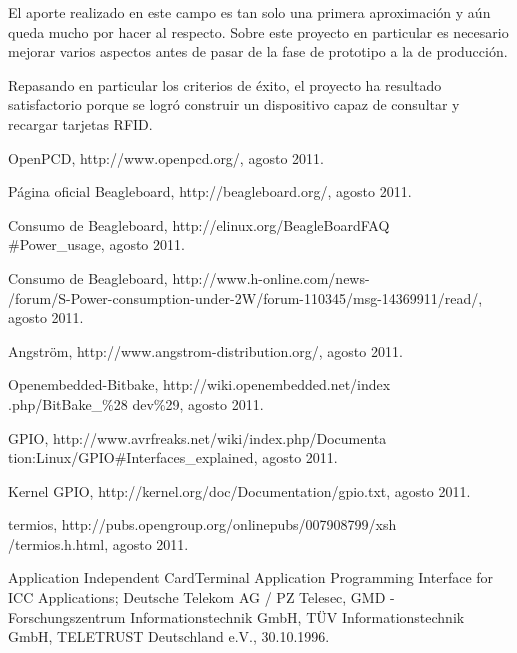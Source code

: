 \documentclass[%
        final,
        notitlepage,
        narroweqnarray,
        inline,
        ]{ieee}
\begin{document}
El aporte realizado en este campo es tan solo una primera aproximación y aún 
queda mucho por hacer al respecto. Sobre este proyecto en particular es
necesario mejorar varios aspectos antes de pasar de la fase de prototipo
a la de producción.


Repasando en particular los criterios de éxito, el proyecto ha resultado satisfactorio
porque se logró construir un dispositivo capaz de consultar y recargar tarjetas RFID.




%
%
\begin{thebibliography}{15}

 OpenPCD, http://www.openpcd.org/, agosto 2011.

 Página oficial Beagleboard, http://beagleboard.org/, agosto 2011.

 Consumo de Beagleboard, http://elinux.org/BeagleBoardFAQ\\
\#Power\_usage, agosto 2011.

 Consumo de Beagleboard, http://www.h-online.com/news-\\
/forum/S-Power-consumption-under-2W/forum-110345/msg-14369911/read/, agosto 2011.

 Angström, http://www.angstrom-distribution.org/, agosto 2011.

 Openembedded-Bitbake, http://wiki.openembedded.net/index\\
.php/BitBake\_\%28
dev\%29, agosto 2011.

 GPIO, http://www.avrfreaks.net/wiki/index.php/Documenta\\
tion:Linux/GPIO\#Interfaces\_explained, agosto 2011.

 Kernel GPIO, http://kernel.org/doc/Documentation/gpio.txt, agosto 2011.

 termios, http://pubs.opengroup.org/onlinepubs/007908799/xsh\\
/termios.h.html, agosto 2011.

 Application Independent CardTerminal Application Programming Interface for ICC Applications; 
Deutsche Telekom AG / PZ Telesec, GMD - Forschungszentrum Informationstechnik GmbH, TÜV Informationstechnik GmbH, TELETRUST Deutschland e.V., 30.10.1996.

\end{thebibliography}
\end{document}
